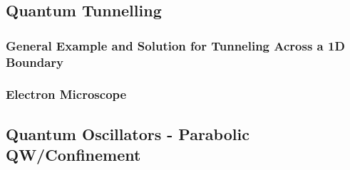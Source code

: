 \documentclass[../../Quantum-Technologies-Notes]{subfiles}
\begin{document}
		\subsection{Quantum Tunnelling}
		
			\subsubsection{General Example and Solution for Tunneling Across a 1D Boundary}
%				
%				
%				
%				
%				
				
			\subsubsection{Electron Microscope}
			
			
		\subsection{Quantum Oscillators - Parabolic QW/Confinement}
			
			
\end{document}
